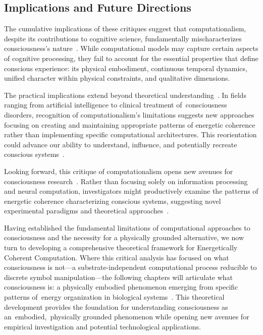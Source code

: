 \subsection*{Implications and Future Directions}

The cumulative implications of these critiques suggest that computationalism, despite its contributions to cognitive science, fundamentally mischaracterizes consciousness's nature~\cite{piccinini2013neural,anderson2024physical}. While computational models may capture certain aspects of cognitive processing, they fail to account for the essential properties that define conscious experience: its physical embodiment, continuous temporal dynamics, unified character within physical constraints, and qualitative dimensions.

The practical implications extend beyond theoretical understanding~\cite{harnad1990symbol}. In fields ranging from artificial intelligence to clinical treatment of~consciousness disorders, recognition of computationalism's limitations suggests new approaches focusing on creating and maintaining appropriate patterns of energetic coherence rather than implementing specific computational architectures. This reorientation could advance our ability to understand, influence, and potentially recreate conscious systems~\cite{bickhard1995foundational}.

Looking forward, this critique of computationalism opens new avenues for consciousness research~\cite{hunt2024electromagnetic,McFadden2020}. Rather than focusing solely on information processing and neural computation, investigators might productively examine the patterns of energetic coherence characterizing conscious systems, suggesting novel experimental paradigms and theoretical approaches~\cite{van2025processes,amil2024theta}.

Having established the fundamental limitations of computational approaches to consciousness and the necessity for a physically grounded alternative, we now turn to developing a comprehensive theoretical framework for Energetically Coherent Computation. Where this critical analysis has focused on what consciousness is not—a substrate-independent computational process reducible to discrete symbol manipulation—the following chapters will articulate what consciousness is: a physically embodied phenomenon emerging from specific patterns of~energy organization in biological systems~\cite{breakspear2005dynamics}. This theoretical development provides the foundation for understanding consciousness as an~embodied,~physically grounded phenomenon while opening new avenues for empirical investigation and potential technological applications.
